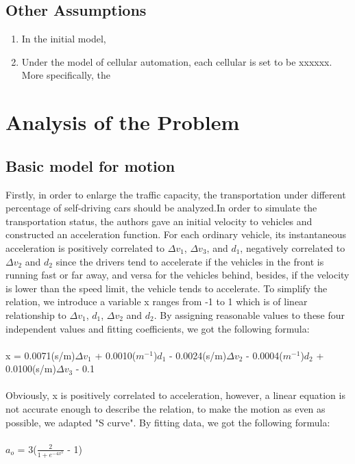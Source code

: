 \documentclass{icmmcm}
\begin{document}
\subsection{Other Assumptions}
\begin{enumerate}
\item In the initial model, 
\item Under the model of cellular automation, each cellular is set to be xxxxxx. More specifically, the 
\end{enumerate}

\section{Analysis of the Problem}
\subsection{Basic model for motion}
Firstly, in order to enlarge the traffic capacity, the transportation under different percentage of self-driving cars should be analyzed.In order to simulate the transportation status, the authors gave an initial velocity to vehicles and constructed an  acceleration function. For each ordinary vehicle, its instantaneous acceleration is positively correlated to $\Delta$$v_{1}$, $\Delta$$v_{3}$, and $d_{1}$, negatively correlated to $\Delta$$v_{2}$ and $d_{2}$ since the drivers tend to accelerate if the vehicles in the front is running fast or far away, and versa for the vehicles behind, besides, if the velocity is lower than the speed limit, the vehicle tends to accelerate. To simplify the relation, we introduce a variable x ranges from -1 to 1 which is of linear relationship to  $\Delta$$v_{1}$,  $d_{1}$, $\Delta$$v_{2}$ and $d_{2}$. By assigning reasonable values to these four independent values and fitting coefficients, we got the following formula:\\
\\
 x = 0.0071(s/m)$\Delta$$v_{1}$ + 0.0010($m^{-1}$)$d_{1}$ - 0.0024(s/m)$\Delta$$v_{2}$ - 0.0004($m^{-1}$)$d_{2}$ + 0.0100(s/m)$\Delta$$v_{3}$ - 0.1
\\
\\
Obviously, x is positively correlated to acceleration, however, a linear equation is not accurate enough to describe the relation, to make the motion as even as possible, we adapted "S curve". By fitting data, we got the following formula:\\
\\
$a_{o}$ = 3($\frac{2}{1 + e^{-4x^{3}}}$ - 1) %
\end{document}
